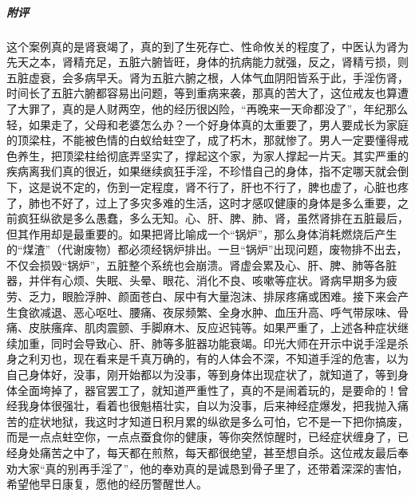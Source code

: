 \begin{case}
    \subparagraph{附评} 这个案例真的是肾衰竭了，真的到了生死存亡、性命攸关的程度了，中医认为肾为先天之本，肾精充足，五脏六腑皆旺，身体的抗病能力就强，反之，肾精亏损，则五脏虚衰，会多病早夭。肾为五脏六腑之根，人体气血阴阳皆系于此，手淫伤肾，时间长了五脏六腑都容易出问题，等到重病来袭，那真的苦大了，这位戒友也算遭了大罪了，真的是人财两空，他的经历很凶险，“再晚来一天命都没了”，年纪那么轻，如果走了，父母和老婆怎么办？一个好身体真的太重要了，男人要成长为家庭的顶梁柱，不能被色情的白蚁给蛀空了，成了朽木，那就惨了。男人一定要懂得戒色养生，把顶梁柱给彻底弄坚实了，撑起这个家，为家人撑起一片天。其实严重的疾病离我们真的很近，如果继续疯狂手淫，不珍惜自己的身体，指不定哪天就会倒下，这是说不定的，伤到一定程度，肾不行了，肝也不行了，脾也虚了，心脏也疼了，肺也不好了，过上了多灾多难的生活，这时才感叹健康的身体是多么重要，之前疯狂纵欲是多么愚蠢，多么无知。心、肝、脾、肺、肾，虽然肾排在五脏最后，但其作用却是最重要的。如果把肾比喻成一个“锅炉”，那么身体消耗燃烧后产生的“煤渣”（代谢废物）都必须经锅炉排出。一旦“锅炉”出现问题，废物排不出去，不仅会损毁“锅炉”，五脏整个系统也会崩溃。肾虚会累及心、肝、脾、肺等各脏器，并伴有心烦、失眠、头晕、眼花、消化不良、咳嗽等症状。肾病早期多为疲劳、乏力，眼脸浮肿、颜面苍白、尿中有大量泡沫、排尿疼痛或困难。接下来会产生食欲减退、恶心呕吐、腰痛、夜尿频繁、全身水肿、血压升高、呼气带尿味、骨痛、皮肤瘙痒、肌肉震颤、手脚麻木、反应迟钝等。如果严重了，上述各种症状继续加重，同时会导致心、肝、肺等多脏器功能衰竭。印光大师在开示中说手淫是杀身之利刃也，现在看来是千真万确的，有的人体会不深，不知道手淫的危害，以为自己身体好，没事，刚开始都以为没事，等到身体出现症状了，就知道了，等到身体全面垮掉了，器官罢工了，就知道严重性了，真的不是闹着玩的，是要命的！曾经我身体很强壮，看着也很魁梧壮实，自以为没事，后来神经症爆发，把我抛入痛苦的症状地狱，我这时才知道日积月累的纵欲是多么可怕，它不是一下把你搞废，而是一点点蛀空你，一点点蚕食你的健康，等你突然惊醒时，已经症状缠身了，已经身处痛苦之中了，每天都在煎熬，每天都很绝望，甚至想自杀。这位戒友最后奉劝大家“真的别再手淫了”，他的奉劝真的是诚恳到骨子里了，还带着深深的害怕，希望他早日康复，愿他的经历警醒世人。
\end{case}

